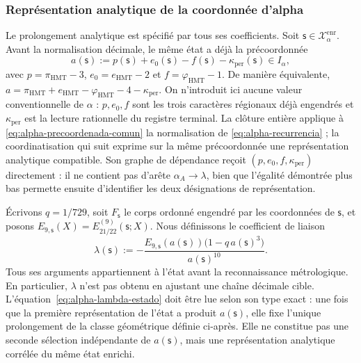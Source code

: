 \subsubsection{Représentation analytique de la coordonnée d'alpha}
\label{subsec:alpha-lector-completo-rev08}

Le prolongement analytique est spécifié par tous ses coefficients.
Soit \(\mathsf s\in\mathcal X_\alpha^{\mathrm{enr}}\). Avant
la normalisation décimale, le même état a déjà la précoordonnée
\begin{equation}
 a(\mathsf s):=p(\mathsf s)+e_0(\mathsf s)-f(\mathsf s)
                 -\kappa_{\mathrm{per}}(\mathsf s)\in I_\alpha,
 \label{eq:alpha-precoordenada-comun}
\end{equation}
avec \(p=\pi_{\mathrm{HMT}}-3\),
\(e_0=e_{\mathrm{HMT}}-2\) et
\(f=\varphi_{\mathrm{HMT}}-1\). De manière équivalente,
\(a=\pi_{\mathrm{HMT}}+e_{\mathrm{HMT}}-
\varphi_{\mathrm{HMT}}-4-\kappa_{\mathrm{per}}\). On n'introduit ici aucune valeur
conventionnelle de \(\alpha\) : \(p,e_0,f\) sont les trois caractères régionaux déjà
engendrés et \(\kappa_{\mathrm{per}}\) est la lecture rationnelle du registre
terminal. La clôture entière applique à
\eqref{eq:alpha-precoordenada-comun} la normalisation de
\eqref{eq:alpha-recurrencia} ; la coordinatisation qui suit exprime sur la même
précoordonnée une représentation analytique compatible. Son graphe de
dépendance reçoit \((p,e_0,f,\kappa_{\mathrm{per}})\) directement : il ne
contient pas d'arête \(\alpha_A\to\lambda\), bien que l'égalité démontrée plus
bas permette ensuite d'identifier les deux désignations de représentation.

Écrivons \(q=1/729\), soit \(F_{\mathsf s}\) le corps ordonné engendré par
les coordonnées de \(\mathsf s\), et posons
\(E_{9,\mathsf s}(X)=E_{21/22}^{(9)}(\mathsf s;X)\). Nous définissons le coefficient
de liaison
\begin{equation}
 \lambda(\mathsf s):=
 -\frac{E_{9,\mathsf s}(a(\mathsf s))
         \bigl(1-q\,a(\mathsf s)^3\bigr)}{a(\mathsf s)^{10}}.
 \label{eq:alpha-lambda-estado}
\end{equation}
Tous ses arguments appartiennent à l'état avant la reconnaissance
métrologique. En particulier, \(\lambda\) n'est pas obtenu en ajustant une chaîne
décimale cible. L'équation~\eqref{eq:alpha-lambda-estado} doit être lue selon
son type exact : une fois que la première représentation de l'état a produit
\(a(\mathsf s)\), elle fixe l'unique prolongement de la classe géométrique
définie ci-après. Elle ne constitue pas une seconde sélection indépendante de
\(a(\mathsf s)\), mais une représentation analytique corrélée du même
état enrichi.

